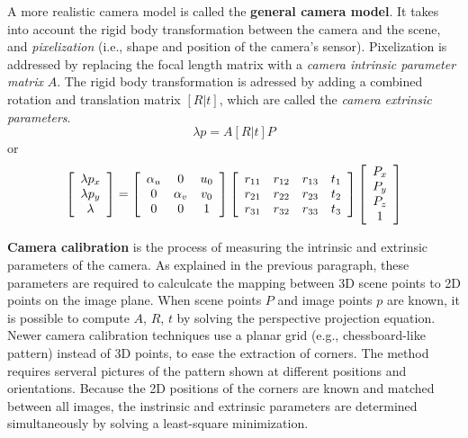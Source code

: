 A more realistic camera model is called the \textbf{general camera model}.
It takes into account the rigid body transformation between the camera and the scene, and \textit{pixelization} (i.e., shape and position of the camera's sensor).
Pixelization is addressed by replacing the focal length matrix with a \textit{camera intrinsic parameter matrix} $A$.
The rigid body transformation is adressed by adding a combined rotation and translation matrix $[R|t]$, which are called the \textit{camera extrinsic parameters}.
\begin{equation}
\lambda p = A [ R | t] P
\end{equation}
or
\begin{equation}
\left[ \begin{array}{c}
\lambda p_x \\
\lambda p_y \\
\lambda
\end{array} \right]
=
\left[ \begin{array}{c c c}
\alpha_u & 0 & u_0 \\
0 & \alpha_v & v_0 \\
0 & 0 & 1
\end{array} \right]
\left[ \begin{array}{c c c c}
r_{11} & r_{12} & r_{13} & t_1 \\
r_{21} & r_{22} & r_{23} & t_2 \\
r_{31} & r_{32} & r_{33} & t_3
\end{array} \right]
\left[ \begin{array}{c}
P_x \\
P_y \\
P_z \\
1
\end{array} \right]
\end{equation}

\textbf{Camera calibration} is the process of measuring the intrinsic and extrinsic parameters of the camera.
As explained in the previous paragraph, these parameters are required to calculcate the mapping between 3D scene points to 2D points on the image plane.
When scene points $P$ and image points $p$ are known, it is possible to compute $A$, $R$, $t$ by solving the perspective projection equation.
Newer camera calibration techniques use a planar grid (e.g., chessboard-like pattern) instead of 3D points, to ease the extraction of corners.
The method requires serveral pictures of the pattern shown at different positions and orientations.
Because the 2D positions of the corners are known and matched between all images, the instrinsic and extrinsic parameters are determined simultaneously by solving a least-square minimization.

